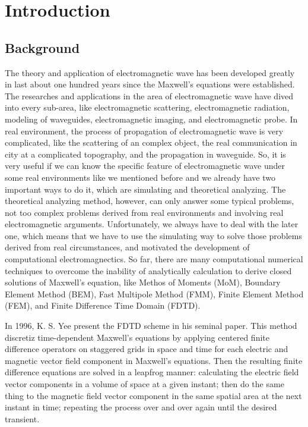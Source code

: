 
\chapter{Introduction}

\section{Background}
The theory and application of electromagnetic wave has been developed greatly in last about one hundred years since the Maxwell's equations were established. The researches and applications in the area of electromagnetic wave have dived into every sub-area,  like electromagnetic scattering, electromagnetic radiation, modeling of waveguides, electromagnetic imaging, and electromagnetic probe. In real environment, the process of propagation of electromagnetic wave is very complicated, like the scattering of an complex object, the real communication in city at a complicated topography, and the propagation in waveguide. So, it is very useful if we can know the specific feature of electromagnetic wave under some real environments like we mentioned before and we already have two important ways to do it, which are simulating and theoretical analyzing. The theoretical analyzing method, however, can only answer some typical problems, not too complex problems derived from real environments and involving real electromagnetic arguments. Unfortunately, we always have to deal with the later one, which means that we have to use the simulating way to solve those problems derived from real circumstances, and motivated the development of computational electromagnectics. So far, there are many computational numerical techniques to overcome the inability of analytically calculation to derive closed solutions of Maxwell's equation, like Methos of Moments (MoM), Boundary Element Method (BEM), Fast Multipole Method (FMM), Finite Element Method (FEM), and Finite Difference Time Domain (FDTD).

In 1996, K. S. Yee \cite{Yee} present the FDTD scheme in his seminal paper. This method discretiz time-dependent Maxwell's equations by applying centered finite difference operators on staggered grids in space and time for each electric and magnetic vector field component in Maxwell's equations. Then the resulting finite difference equations are solved in a leapfrog manner: calculating the electric field vector components in a volume of space at a given instant; then do the same thing to the magnetic field vector component in the same spatial area at the next instant in time; repeating the process over and over again until the desired transient.

